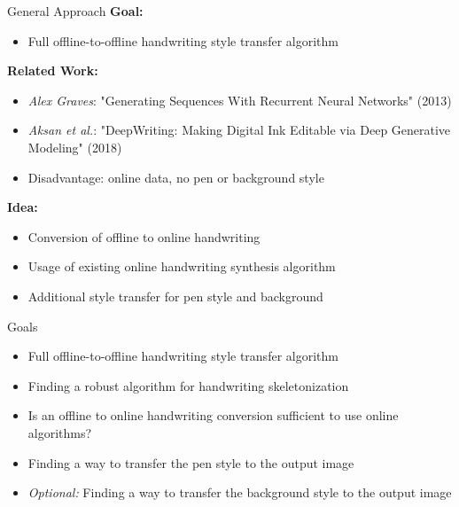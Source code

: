 \documentclass[aspectratio=169]{beamer}
\begin{document}
\begin{frame}{General Approach}
\textbf{Goal:}
\begin{itemize}
\item Full offline-to-offline handwriting style transfer algorithm
\end{itemize}
\vspace{1em}

\textbf{Related Work:}
\begin{itemize}
\item \emph{Alex Graves}: "Generating Sequences With Recurrent Neural Networks" (2013)
\item \emph{Aksan et al.}: "DeepWriting: Making Digital Ink Editable via Deep Generative Modeling" (2018)
\item Disadvantage: online data, no pen or background style
\end{itemize}
\vspace{1em}

\textbf{Idea:}
\begin{itemize}
\item Conversion of offline to online handwriting
\item Usage of existing online handwriting synthesis algorithm
\item Additional style transfer for pen style and background
\end{itemize}

\end{frame}




\begin{frame}{Goals}
\begin{itemize}
\item Full offline-to-offline handwriting style transfer algorithm
\item Finding a robust algorithm for handwriting skeletonization
\item Is an offline to online handwriting conversion sufficient to use online algorithms?
\item Finding a way to transfer the pen style to the output image
\item \emph{Optional:} Finding a way to transfer the background style to the output image
\end{itemize}
\end{frame}
\end{document}
